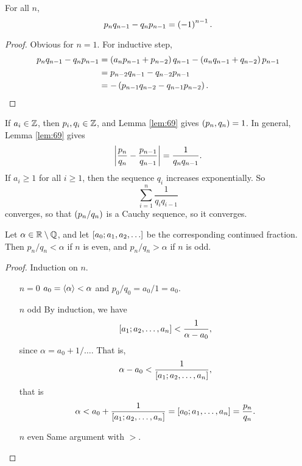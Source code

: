 \begin{lemma}
\label{lem:69}
For all $ n $,
$$ p_nq_{n - 1} - q_np_{n - 1} = \rb{-1}^{n - 1}. $$
\end{lemma}

\begin{proof}
Obvious for $ n = 1 $. For inductive step,
\begin{align*}
p_nq_{n - 1} - q_np_{n - 1}
& = \rb{a_np_{n - 1} + p_{n - 2}}q_{n - 1} - \rb{a_nq_{n - 1} + q_{n - 2}}p_{n - 1} \\
& = p_{n - 2}q_{n - 1} - q_{n - 2}p_{n - 1} \\
& = -\rb{p_{n - 1}q_{n - 2} - q_{n - 1}p_{n - 2}}.
\end{align*}
\end{proof}

\begin{note}
If $ a_i \in \Z $, then $ p_i, q_i \in \Z $, and Lemma \ref{lem:69} gives $ \rb{p_n, q_n} = 1 $. In general, Lemma \ref{lem:69} gives
$$ \abs{\dfrac{p_n}{q_n} - \dfrac{p_{n - 1}}{q_{n - 1}}} = \dfrac{1}{q_nq_{n - 1}}. $$
If $ a_i \ge 1 $ for all $ i \ge 1 $, then the sequence $ q_i $ increases exponentially. So
$$ \sum_{i = 1}^n \dfrac{1}{q_iq_{i - 1}} $$
converges, so that $ \rb{p_n / q_n} $ is a Cauchy sequence, so it converges.
\end{note}


\begin{lemma}
\label{lem:70}
Let $ \alpha \in \R \setminus \Q $, and let $ \sb{a_0; a_1, a_2, \dots} $ be the corresponding continued fraction. Then $ p_n / q_n < \alpha $ if $ n $ is even, and $ p_n / q_n > \alpha $ if $ n $ is odd.
\end{lemma}

\begin{proof}
Induction on $ n $.
\begin{itemize}[leftmargin=0.5in]
\item[$ n = 0 $] $ a_0 = \fb{\alpha} < \alpha $ and $ p_0 / q_0 = a_0 / 1 = a_0 $.
\item[$ n $ odd] By induction, we have
$$ \sb{a_1; a_2, \dots, a_n} < \dfrac{1}{\alpha - a_0}, $$
since $ \alpha = a_0 + 1 / \dots $. That is,
$$ \alpha - a_0 < \dfrac{1}{\sb{a_1; a_2, \dots, a_n}}, $$
that is
$$ \alpha < a_0 + \dfrac{1}{\sb{a_1; a_2, \dots, a_n}} = \sb{a_0; a_1, \dots, a_n} = \dfrac{p_n}{q_n}. $$
\item[$ n $ even] Same argument with $ > $.
\end{itemize}
\end{proof}

